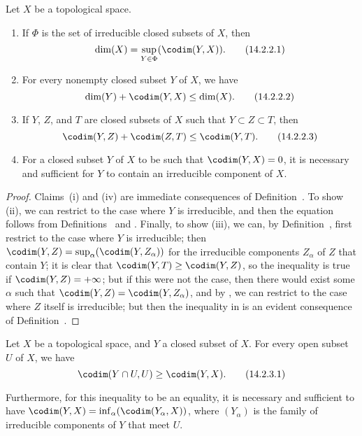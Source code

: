 \begin{prop}[14.2.2]
\label{0.14.2.2}
Let $X$ be a topological space.
\begin{enumerate}[label=\emph{(\roman*)}]
  \item If $\Phi$ is the set of irreducible closed subsets of $X$, then
    \[
    \label{0.14.2.2.1}
      \dim(X)=\sup_{Y\in\Phi}(\codim(Y,X)).
      \tag{14.2.2.1}
    \]
  \item For every nonempty closed subset $Y$ of $X$, we have
    \[
    \label{0.14.2.2.2}
      \dim(Y)+\codim(Y,X)\leq\dim(X).
      \tag{14.2.2.2}
    \]
  \item If $Y$, $Z$, and $T$ are closed subsets of $X$ such that $Y\subset Z\subset T$, then
    \[
    \label{0.14.2.2.3}
      \codim(Y,Z)+\codim(Z,T)\leq\codim(Y,T).
       \tag{14.2.2.3}
    \]
  \item For a closed subset $Y$ of $X$ to be such that $\codim(Y,X)=0$, it is necessary and sufficient for $Y$ to contain an irreducible component of $X$.
\end{enumerate}
\end{prop}

\begin{proof}
\label{proof-0.14.2.2}
Claims~(i) and (iv) are immediate consequences of Definition~.
To show (ii), we can restrict to the case where $Y$ is irreducible, and then the equation follows from Definitions~ and .
Finally, to show (iii), we can, by Definition~, first restrict to the case where $Y$ is irreducible;
then $\codim(Y,Z)=\sup_\alpha(\codim(Y,Z_\alpha))$ for the irreducible components $Z_\alpha$ of $Z$ that contain $Y$;
it is clear that $\codim(Y,T)\geq\codim(Y,Z)$, so the inequality is true if $\codim(Y,Z)=+\infty$;
but if this were not the case, then there would exist some $\alpha$ such that $\codim(Y,Z)=\codim(Y,Z_\alpha)$, and by , we can restrict to the case where $Z$ itself is irreducible;
but then the inequality in  is an evident consequence of Definition~.
\end{proof}

\begin{prop}[14.2.3]
\label{0.14.2.3}
Let $X$ be a topological space, and $Y$ a closed subset of $X$.
For every open subset $U$ of $X$, we have
\[
\label{0.14.2.3.1}
  \codim(Y\cap U,U)\geq\codim(Y,X).
  \tag{14.2.3.1}
\]

Furthermore, for this inequality  to be an equality, it is necessary and sufficient to have $\codim(Y,X)=\inf_\alpha(\codim(Y_\alpha,X))$, where $(Y_\alpha)$ is the family of irreducible components of $Y$ that meet $U$.
\end{prop}

